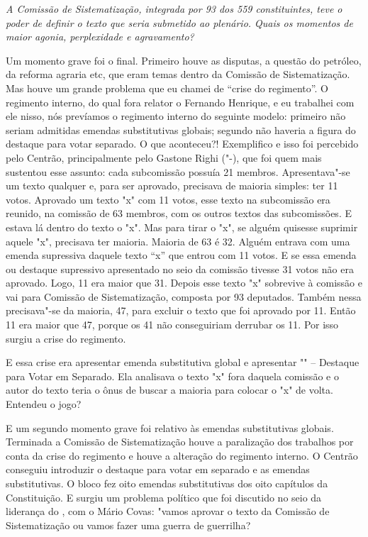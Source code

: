 \medskip

\emph{A Comissão de Sistematização, integrada por 93 dos 559
constituintes, teve o poder de definir o texto que seria submetido ao
plenário. Quais os momentos de maior agonia, perplexidade e
agravamento?}

Um momento grave foi o final. Primeiro houve as
disputas, a questão do petróleo, da reforma agraria etc, que eram temas
dentro da Comissão de Sistematização. Mas houve um grande problema que
eu chamei de ``crise do regimento''. O regimento interno, do qual fora
relator o Fernando Henrique, e eu trabalhei com ele nisso, nós prevíamos
o regimento interno do seguinte modelo: primeiro não seriam admitidas
emendas substitutivas globais; segundo não haveria a figura do destaque
para votar separado. O que aconteceu?! Exemplifico e isso foi percebido
pelo Centrão, principalmente pelo Gastone Righi ("-), que foi quem
mais sustentou esse assunto: cada subcomissão possuía 21 membros.
Apresentava"-se um texto qualquer e, para ser aprovado, precisava de
maioria simples: ter 11 votos. Aprovado um texto "x" com 11 votos, esse
texto na subcomissão era reunido, na comissão de 63 membros, com os
outros textos das subcomissões. E estava lá dentro do texto o "x". Mas
para tirar o "x", se alguém quisesse suprimir aquele "x", precisava ter
maioria. Maioria de 63 é 32. Alguém entrava com uma emenda supressiva
daquele texto ``x'' que entrou com 11 votos. E se essa emenda ou
destaque supressivo apresentado no seio da comissão tivesse 31 votos não
era aprovado. Logo, 11 era maior que 31. Depois esse texto "x" sobrevive
à comissão e vai para Comissão de Sistematização, composta por 93
deputados. Também nessa precisava"-se da maioria, 47, para excluir o
texto que foi aprovado por 11. Então 11 era maior que 47, porque os 41
não conseguiriam derrubar os 11. Por isso surgiu a crise do regimento.

E essa crise era apresentar emenda substitutiva global e apresentar
"" -- Destaque para Votar em Separado. Ela analisava o texto "x" fora
daquela comissão e o autor do texto teria o ônus de buscar a maioria
para colocar o "x" de volta. Entendeu o jogo?

E um segundo momento grave foi relativo às emendas substitutivas
globais. Terminada a Comissão de Sistematização houve a paralização dos
trabalhos por conta da crise do regimento e houve a alteração do
regimento interno. O Centrão conseguiu introduzir o destaque para votar
em separado e as emendas substitutivas. O bloco fez oito emendas
substitutivas dos oito capítulos da Constituição. E surgiu um problema
político que foi discutido no seio da liderança do , com o Mário
Covas: "vamos aprovar o texto da Comissão de Sistematização ou vamos
fazer uma guerra de guerrilha?

